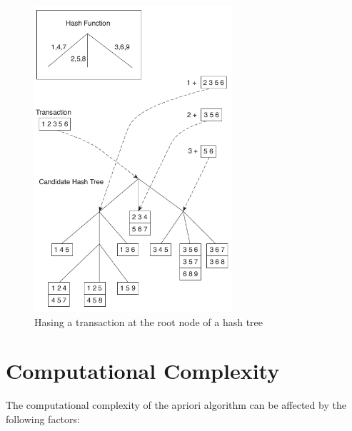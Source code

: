 		\begin{figure}[H]
			\centering
			\includegraphics[scale=0.6]{pics/hash.png}
			\caption{Hasing a transaction at the root node of a hash tree}
		\end{figure}

	\section{Computational Complexity}

	The computational complexity of the apriori algorithm can be affected by the following factors:

